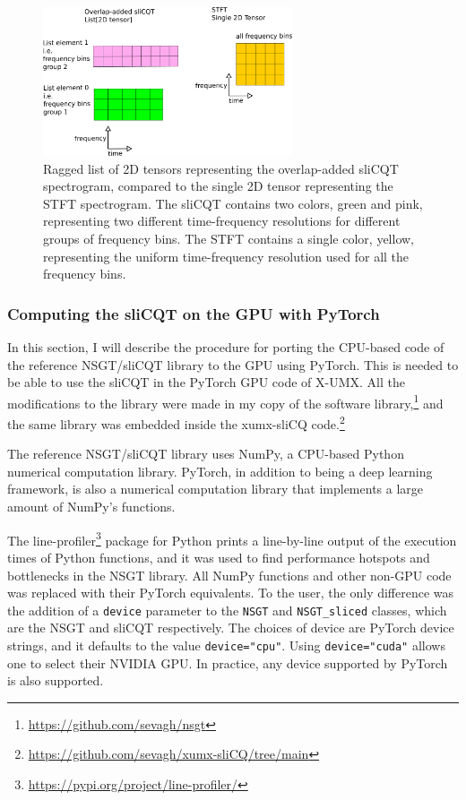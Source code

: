 \documentclass[report.tex]{subfiles}
\begin{document}
\begin{figure}[ht]
	\centering
	\includegraphics[width=0.65635\textwidth]{./images-blockdiagrams/2dslicqolastft.png}
	\caption{Ragged list of 2D tensors representing the overlap-added sliCQT spectrogram, compared to the single 2D tensor representing the STFT spectrogram. The sliCQT contains two colors, green and pink, representing two different time-frequency resolutions for different groups of frequency bins. The STFT contains a single color, yellow, representing the uniform time-frequency resolution used for all the frequency bins.}
	\label{fig:2dslicqolastft}
\end{figure}

\subsubsection{Computing the sliCQT on the GPU with PyTorch}
\label{sec:torchslicq}

In this section, I will describe the procedure for porting the CPU-based code of the reference NSGT/sliCQT library to the GPU using PyTorch. This is needed to be able to use the sliCQT in the PyTorch GPU code of X-UMX. All the modifications to the library were made in my copy of the software library,\footnote{\url{https://github.com/sevagh/nsgt}} and the same library was embedded inside the xumx-sliCQ code.\footnote{\url{https://github.com/sevagh/xumx-sliCQ/tree/main}}

The reference NSGT/sliCQT library uses NumPy, a CPU-based Python numerical computation library. PyTorch, in addition to being a deep learning framework, is also a numerical computation library that implements a large amount of NumPy's functions.

The line-profiler\footnote{\url{https://pypi.org/project/line-profiler/}} package for Python prints a line-by-line output of the execution times of Python functions, and it was used to find performance hotspots and bottlenecks in the NSGT library. All NumPy functions and other non-GPU code was replaced with their PyTorch equivalents. To the user, the only difference was the addition of a \Verb#device# parameter to the \Verb#NSGT# and \Verb#NSGT_sliced# classes, which are the NSGT and sliCQT respectively. The choices of device are PyTorch device strings, and it defaults to the value \Verb#device="cpu"#. Using \Verb#device="cuda"# allows one to select their NVIDIA GPU. In practice, any device supported by PyTorch is also supported.
\end{document}
